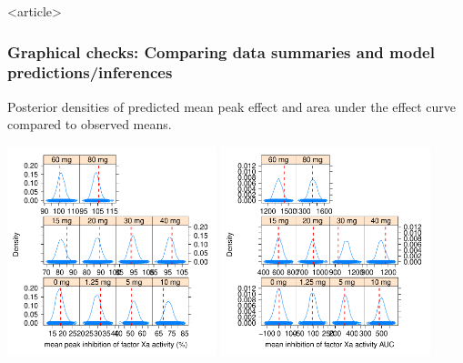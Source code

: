 \documentclass[handout]{beamer}
\begin{document}
\begin{frame}<article>
  \frametitle{Graphical checks: Comparing data summaries and model predictions/inferences}
  
    Posterior densities of predicted mean peak effect and area under
    the effect curve compared to observed means.
\vspace{-0.25in}
  \begin{center}
    \includegraphics[width=2.4in,trim=0.2in 0 0
    0,clip]{graphics/me2HandsOn2Plots025.pdf}
    \includegraphics[width=2.4in,trim=0.2in 0 0
    0,clip]{graphics/me2HandsOn2Plots026.pdf}
  \end{center}

\end{frame}
\end{document}
